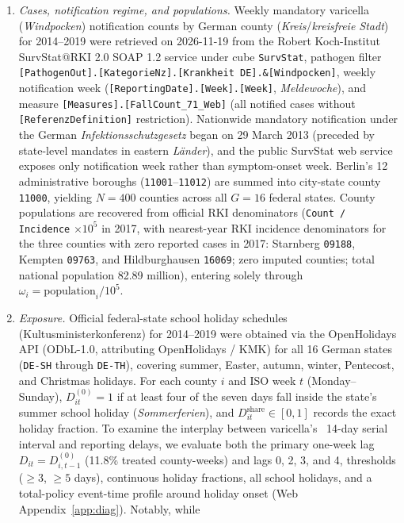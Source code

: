 \begin{enumerate}
\item \emph{Cases, notification regime, and populations.} Weekly mandatory varicella
(\emph{Windpocken}) notification counts by German county (\emph{Kreis}/\emph{kreisfreie Stadt})
for 2014--2019 were retrieved on 2026-11-19 from the Robert Koch-Institut SurvStat@RKI 2.0 SOAP 1.2 service
\citep{faensen2006survnet} under cube \texttt{SurvStat}, pathogen filter
\texttt{[PathogenOut].[KategorieNz].[Krankheit DE].\&[Windpocken]}, weekly notification week
(\texttt{[ReportingDate].[Week].[Week]}, \emph{Meldewoche}), and measure
\texttt{[Measures].[FallCount\_71\_Web]} (all notified cases without
\texttt{[ReferenzDefinition]} restriction). Nationwide mandatory notification under the German
\emph{Infektionsschutzgesetz} began on 29 March 2013 (preceded by state-level mandates in eastern
\emph{L\"ander}), and the public SurvStat web service exposes only notification week rather than
symptom-onset week. Berlin's 12 administrative boroughs (\texttt{11001}--\texttt{11012}) are
summed into city-state county \texttt{11000}, yielding $N=400$ counties across all $G=16$ federal
states. County populations are recovered from official RKI denominators
(\texttt{Count / Incidence} $\times 10^5$ in 2017, with nearest-year RKI incidence denominators
for the three counties with zero reported cases in 2017: Starnberg \texttt{09188}, Kempten
\texttt{09763}, and Hildburghausen \texttt{16069}; zero imputed counties; total national population
82.89 million), entering solely through $\omega_i=\text{population}_i/10^5$.
\item \emph{Exposure.} Official federal-state school holiday schedules (Kultusministerkonferenz)
for 2014--2019 were obtained via the OpenHolidays API (ODbL-1.0, attributing OpenHolidays / KMK) for all 16 German states (\texttt{DE-SH}
through \texttt{DE-TH}), covering summer, Easter, autumn, winter, Pentecost, and Christmas
holidays. For each county $i$ and ISO week $t$ (Monday--Sunday), $D^{(0)}_{it}=1$ if at least four
of the seven days fall inside the state's summer school holiday (\emph{Sommerferien}), and
$D^{\mathrm{share}}_{it}\in[0,1]$ records the exact holiday fraction. To examine the interplay
between varicella's ~14-day serial interval and reporting delays, we evaluate both the primary
one-week lag $D_{it}=D^{(0)}_{i,t-1}$ (11.8\% treated county-weeks) and lags 0, 2, 3, and 4,
thresholds ($\ge 3$, $\ge 5$ days), continuous holiday fractions, all school holidays, and a
total-policy event-time profile around holiday onset (Web Appendix~\ref{app:diag}). Notably, while

\end{enumerate}
